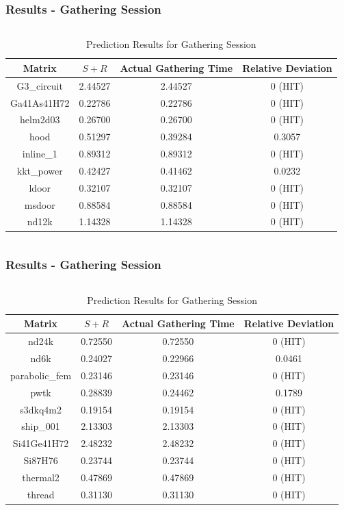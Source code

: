\documentclass{beamer}
\begin{document}
\begin{frame}
\frametitle{Results - Gathering Session}
\begin{columns}[c]
\begin{table}[h!]
\centering
\caption{Prediction Results for Gathering Session}
\begin{tabular}{|c|c|c|c|}
\hline
Matrix & $S+R$ & Actual Gathering Time & Relative Deviation \\
\hline
G3\_circuit & 2.44527 & 2.44527 & 0 (HIT) \\
Ga41As41H72 & 0.22786 & 0.22786 & 0 (HIT) \\
helm2d03 & 0.26700 & 0.26700 & 0 (HIT) \\
hood & 0.51297 & 0.39284 & 0.3057\\
inline\_1 & 0.89312 & 0.89312 & 0 (HIT) \\
kkt\_power & 0.42427 & 0.41462 & 0.0232\\
ldoor & 0.32107 & 0.32107 & 0 (HIT) \\
msdoor & 0.88584 & 0.88584 & 0 (HIT)\\
nd12k & 1.14328 & 1.14328 & 0 (HIT) \\
\hline
\end{tabular}
\end{table}

\end{columns}
\end{frame}
\begin{frame}
\frametitle{Results - Gathering Session}
\begin{columns}[c]

\begin{table}[h!]
\centering
\caption{Prediction Results for Gathering Session}
\begin{tabular}{|c|c|c|c|}
\hline
Matrix & $S+R$ & Actual Gathering Time & Relative Deviation \\
\hline
nd24k & 0.72550 & 0.72550 & 0 (HIT) \\
nd6k & 0.24027 & 0.22966 & 0.0461 \\
parabolic\_fem & 0.23146 & 0.23146 & 0 (HIT) \\
pwtk & 0.28839 & 0.24462 & 0.1789\\
s3dkq4m2 & 0.19154 & 0.19154 & 0 (HIT) \\
ship\_001 & 2.13303& 2.13303 & 0 (HIT) \\
Si41Ge41H72 & 2.48232 & 2.48232 & 0 (HIT) \\
Si87H76 & 0.23744 & 0.23744 & 0 (HIT) \\
thermal2 & 0.47869 & 0.47869 & 0 (HIT) \\
thread & 0.31130 & 0.31130 & 0 (HIT) \\
\hline
\end{tabular}
\end{table}

\end{columns}
\end{frame}
\end{document}

